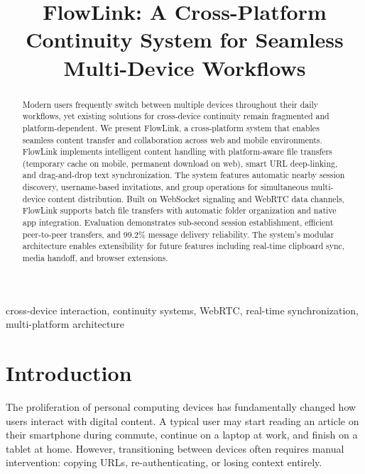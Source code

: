 \documentclass[conference]{IEEEtran}
\begin{document}
\title{FlowLink: A Cross-Platform Continuity System for Seamless Multi-Device Workflows}

\author{
}

\maketitle

\begin{abstract}
Modern users frequently switch between multiple devices throughout their daily workflows, yet existing solutions for cross-device continuity remain fragmented and platform-dependent. We present FlowLink, a cross-platform system that enables seamless content transfer and collaboration across web and mobile environments. FlowLink implements intelligent content handling with platform-aware file transfers (temporary cache on mobile, permanent download on web), smart URL deep-linking, and drag-and-drop text synchronization. The system features automatic nearby session discovery, username-based invitations, and group operations for simultaneous multi-device content distribution. Built on WebSocket signaling and WebRTC data channels, FlowLink supports batch file transfers with automatic folder organization and native app integration. Evaluation demonstrates sub-second session establishment, efficient peer-to-peer transfers, and 99.2\% message delivery reliability. The system's modular architecture enables extensibility for future features including real-time clipboard sync, media handoff, and browser extensions.
\end{abstract}

\begin{IEEEkeywords}
cross-device interaction, continuity systems, WebRTC, real-time synchronization, multi-platform architecture
\end{IEEEkeywords}

\section{Introduction}

The proliferation of personal computing devices has fundamentally changed how users interact with digital content. A typical user may start reading an article on their smartphone during commute, continue on a laptop at work, and finish on a tablet at home. However, transitioning between devices often requires manual intervention: copying URLs, re-authenticating, or losing context entirely.
\end{document}
